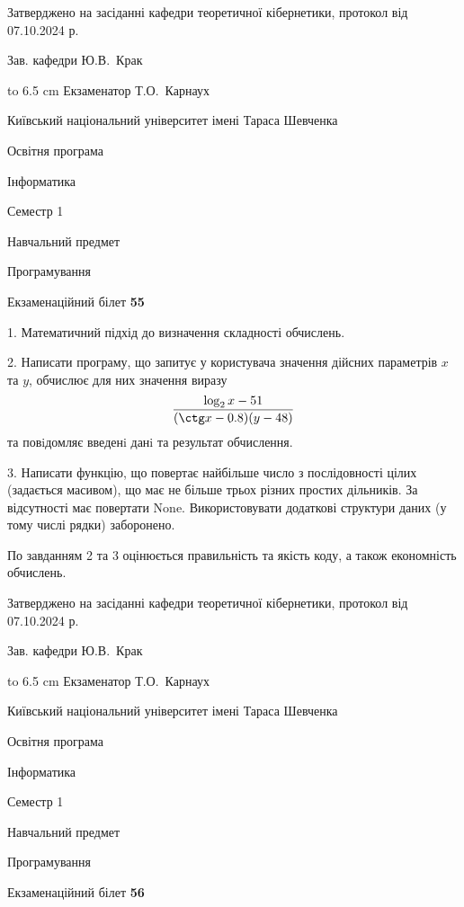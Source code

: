 \documentclass[12pt, ukrainian]{article}
\begin{document}
{\smallskip\smallskip \begin {scriptsize} Затверджено на засіданні кафедри теоретичної кібернетики, протокол   від   07.10.2024 р.\par\smallskip\smallskip\smallskip\smallskip
{\parbox {6.5 cm} {Зав. кафедри \dotfill Ю.В.~Крак}}\hspace {0.7cm} {\hbox to 6.5 cm { Екзаменатор \dotfill Т.О.~Карнаух}} \end{scriptsize}}
\newpage
{{\begin {scriptsize}\par
{ \center  Київський національний університет імені Тараса Шевченка \par}
{\parbox {5 cm}{Освітня програма \hfill}{\parbox {7 cm}{Інформатика\hfill}}\parbox {6 cm}{\hfill Семестр 1}}\par
{\parbox {5 cm} {Навчальний предмет \hfill}\parbox {7 cm}{Програмування \hfill}\parbox {6cm}{\hfill}\par}\vspace{-15pt} \end{scriptsize}}{\center Екзаменаційний білет \No \textbf { 55 }\par}}
{%
1. Математичний підхід до визначення складності обчислень.%
\par
2. Написати програму, що запитує у користувача значення дійсних параметрів $x$ та $y$, обчислює для них значення виразу 
$$\frac{\log_{2} x - 51}{(\ctg x - 0.8) (y - 48)}$$ 
та повiдомляє введенi данi та результат обчислення.

\par
3. Написати функцію, що повертає найбільше число з послідовності цілих (задається масивом), що має не більше трьох різних простих дільників. За відсутності має повертати None. Використовувати додаткові структури даних (у тому числі рядки) заборонено.

По завданням 2 та 3 оцінюється правильність та якість коду, а також економність обчислень.

}
{\smallskip\smallskip \begin {scriptsize} Затверджено на засіданні кафедри теоретичної кібернетики, протокол   від   07.10.2024 р.\par\smallskip\smallskip\smallskip\smallskip
{\parbox {6.5 cm} {Зав. кафедри \dotfill Ю.В.~Крак}}\hspace {0.7cm} {\hbox to 6.5 cm { Екзаменатор \dotfill Т.О.~Карнаух}} \end{scriptsize}}
\vspace{0.9cm}
{{\begin {scriptsize}\par
{ \center  Київський національний університет імені Тараса Шевченка \par}
{\parbox {5 cm}{Освітня програма \hfill}{\parbox {7 cm}{Інформатика\hfill}}\parbox {6 cm}{\hfill Семестр 1}}\par
{\parbox {5 cm} {Навчальний предмет \hfill}\parbox {7 cm}{Програмування \hfill}\parbox {6cm}{\hfill}\par}\vspace{-15pt} \end{scriptsize}}{\center Екзаменаційний білет \No \textbf { 56 }\par}}
\end{document}

